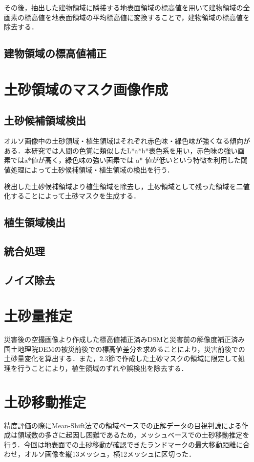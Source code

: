       その後，抽出した建物領域に隣接する地表面領域の標高値を用いて建物領域の全画素の標高値を地表面領域の平均標高値に変換することで，建物領域の標高値を除去する．

    \subsection{建物領域の標高値補正}

  
  \section{土砂領域のマスク画像作成}
    \subsection{土砂候補領域検出}
      オルソ画像中の土砂領域・植生領域はそれぞれ赤色味・緑色味が強くなる傾向がある．本研究では人間の色覚に類似したL*a*b*表色系を用い，赤色味の強い画素ではa*値が高く，緑色味の強い画素では a* 値が低いという特徴を利用した閾値処理によって土砂候補領域・植生領域の検出を行う．
      
      検出した土砂候補領域より植生領域を除去し，土砂領域として残った領域を二値化することによって土砂マスクを生成する．
  
    \subsection{植生領域検出}
    \subsection{統合処理}
    \subsection{ノイズ除去}

  
  \section{土砂量推定}
    災害後の空撮画像より作成した標高値補正済みDSMと災害前の解像度補正済み国土地理院DEMの被災前後での標高値差分を求めることにより，災害前後での土砂量変化を算出する．また，2.3節で作成した土砂マスクの領域に限定して処理を行うことにより，植生領域のずれや誤検出を除去する．
  

  \section{土砂移動推定}
    精度評価の際にMean-Shift法での領域ベースでの正解データの目視判読による作成は領域数の多さに起因し困難であるため，メッシュベースでの土砂移動推定を行う．今回は地表面での土砂移動が確認できたランドマークの最大移動距離に合わせ，オルソ画像を縦13メッシュ，横12メッシュに区切った．


